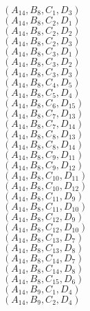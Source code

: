 \documentclass[14pt]{article}
\begin{document}
    $({A}_{14}, {B}_{8}, {C}_{1}, {D}_{3}) $ \\ 
    $({A}_{14}, {B}_{8}, {C}_{2}, {D}_{1}) $ \\ 
    $({A}_{14}, {B}_{8}, {C}_{2}, {D}_{2}) $ \\ 
    $({A}_{14}, {B}_{8}, {C}_{2}, {D}_{3}) $ \\ 
    $({A}_{14}, {B}_{8}, {C}_{3}, {D}_{1}) $ \\ 
    $({A}_{14}, {B}_{8}, {C}_{3}, {D}_{2}) $ \\ 
    $({A}_{14}, {B}_{8}, {C}_{3}, {D}_{3}) $ \\ 
    $({A}_{14}, {B}_{8}, {C}_{4}, {D}_{5}) $ \\ 
    $({A}_{14}, {B}_{8}, {C}_{5}, {D}_{4}) $ \\ 
    $({A}_{14}, {B}_{8}, {C}_{6}, {D}_{15}) $ \\ 
    $({A}_{14}, {B}_{8}, {C}_{7}, {D}_{13}) $ \\ 
    $({A}_{14}, {B}_{8}, {C}_{7}, {D}_{14}) $ \\ 
    $({A}_{14}, {B}_{8}, {C}_{8}, {D}_{13}) $ \\ 
    $({A}_{14}, {B}_{8}, {C}_{8}, {D}_{14}) $ \\ 
    $({A}_{14}, {B}_{8}, {C}_{9}, {D}_{11}) $ \\ 
    $({A}_{14}, {B}_{8}, {C}_{9}, {D}_{12}) $ \\ 
    $({A}_{14}, {B}_{8}, {C}_{10}, {D}_{11}) $ \\ 
    $({A}_{14}, {B}_{8}, {C}_{10}, {D}_{12}) $ \\ 
    $({A}_{14}, {B}_{8}, {C}_{11}, {D}_{9}) $ \\ 
    $({A}_{14}, {B}_{8}, {C}_{11}, {D}_{10}) $ \\ 
    $({A}_{14}, {B}_{8}, {C}_{12}, {D}_{9}) $ \\ 
    $({A}_{14}, {B}_{8}, {C}_{12}, {D}_{10}) $ \\ 
    $({A}_{14}, {B}_{8}, {C}_{13}, {D}_{7}) $ \\ 
    $({A}_{14}, {B}_{8}, {C}_{13}, {D}_{8}) $ \\ 
    $({A}_{14}, {B}_{8}, {C}_{14}, {D}_{7}) $ \\ 
    $({A}_{14}, {B}_{8}, {C}_{14}, {D}_{8}) $ \\ 
    $({A}_{14}, {B}_{8}, {C}_{15}, {D}_{6}) $ \\ 
    $({A}_{14}, {B}_{9}, {C}_{1}, {D}_{4}) $ \\ 
    $({A}_{14}, {B}_{9}, {C}_{2}, {D}_{4}) $ \\ 
\end{document}
